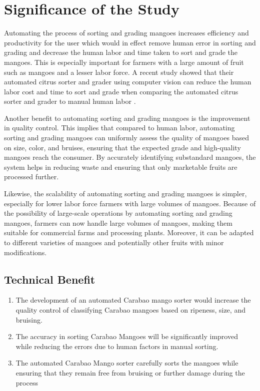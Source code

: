
\section{Significance of the Study}

Automating the process of sorting and grading mangoes increases efficiency and 
productivity for the user which would in effect remove human error in sorting and
 grading and decrease the human labor and time taken to sort and grade the mangoes.
  This is especially important for farmers with a large amount of fruit such as mangoes and a
   lesser labor force. A recent study showed that
    their automated citrus sorter and grader using computer vision can reduce the human
	 labor cost and time to sort and grade when comparing the automated citrus sorter and grader
	  to manual human labor \cite{chakraborty-development-2023}. 

Another benefit to automating sorting and grading mangoes is the improvement in quality control.
 This implies that compared to human labor, automating sorting and grading mangoes can uniformly 
 assess the quality of mangoes based on size, color, and bruises, ensuring that the expected grade and
  high-quality mangoes reach the consumer. By accurately identifying substandard mangoes, the system 
  helps in reducing waste and ensuring that only marketable fruits are processed further.

Likewise, the scalability of automating sorting and grading mangoes is simpler, especially 
for lower labor force farmers with large volumes of mangoes. Because of the possibility of
 large-scale operations by automating sorting and grading mangoes, farmers can now handle large
  volumes of mangoes, making them suitable for commercial farms and processing plants. Moreover,
   it can be adapted to different varieties of mangoes and potentially other fruits with minor modifications.


\subsection{Technical Benefit}

\begin{enumerate}
	\item The development of an automated Carabao mango sorter would increase the quality control 
	of classifying Carabao mangoes based on ripeness, size, and bruising.
	
	\item The accuracy in sorting Carabao Mangoes will be significantly improved while
	 reducing the errors due to human factors in manual sorting.
	
	\item The automated Carabao Mango sorter carefully sorts the mangoes 
	while ensuring that they remain free from bruising or further damage during the process	
\end{enumerate}

